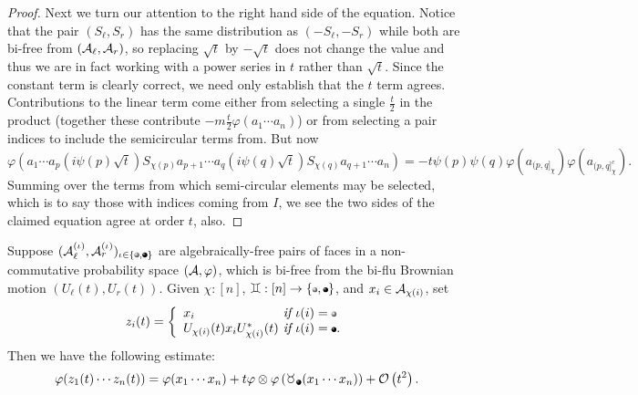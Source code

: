 \begin{proof}
	Next we turn our attention to the right hand side of the equation.
	Notice that the pair $(S_\ell, S_r)$ has the same distribution as $(-S_\ell, -S_r)$ while both are bi-free from $(\mathcal{A}_\ell, \mathcal{A}_r)$, so replacing $\sqrt{t}$ by $-\sqrt{t}$ does not change the value and thus we are in fact working with a power series in $t$ rather than $\sqrt{t}$.
	Since the constant term is clearly correct, we need only establish that the $t$ term agrees.
	Contributions to the linear term come either from selecting a single $\frac{t}{2}$ in the product (together these contribute $-m\frac{t}{2}\varphi(a_1\cdots a_n)$) or from selecting a pair indices to include the semicircular terms from.
	But now
	$$\varphi(a_1\cdots a_{p}(i\psi(p)\sqrt{t})S_{\chi(p)}a_{p+1}\cdots a_{q} (i\psi(q)\sqrt{t})S_{\chi(q)} a_{q+1}\cdots a_n)
	= -t\psi(p)\psi(q)\varphi(a_{(p, q]_\chi})\varphi(a_{(p, q]^c_\chi}).
	$$
	Summing over the terms from which semi-circular elements may be selected, which is to say those with indices coming from $I$, we see the two sides of the claimed equation agree at order $t$, also. 
\end{proof}

\begin{theorem}
	Suppose $(\A^{(\iota)}_\ell, \A^{(\iota)}_r)_{\iota \in \set{\makeaball{0}, \makeaball{1}}}$ are algebraically-free pairs of faces in a non-commutative probability space $(\mathcal{A}, \varphi)$, which is bi-free from the bi-flu Brownian motion $(U_\ell(t), U_r(t))$.
	Given $\chi : [n]$, $\gem : [n]\to\set{\makeaball{0}, \makeaball{1}}$, and $x_i \in \mathcal{A}_{\chi(i)}$, set
	$$z_i{(t)} = \left\{\begin{array}{l@{\emph{ if }}l} %
			x_i & \e(i) = \makeaball{0}\\
			U_{\chi(i)}(t) x_i U_{\chi(i)}^*(t) & \e(i) = \makeaball{1}.
	\end{array}\right.$$
	Then we have the following estimate:
	$$
	\varphi(z_1{(t)}\cdots z_n{(t)}) = \varphi(x_1\cdots x_n) + t\varphi\otimes\varphi\paren{\taur_{\makeaball{1}}(x_1\cdots x_n)} + \bigO{t^2}.
	$$
\end{theorem}

